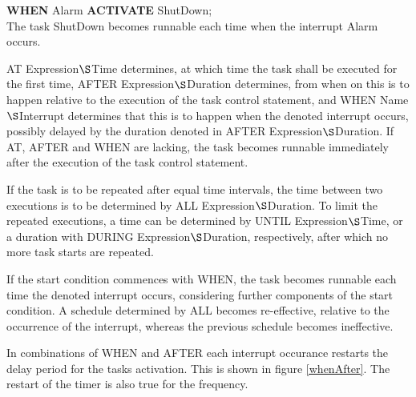 {\bf WHEN} Alarm {\bf ACTIVATE} ShutDown;\\
The task ShutDown becomes runnable each time when the
interrupt Alarm occurs.

AT  
 Expression$\S $Time determines, at which time the task shall be
executed for the first time, AFTER
 Expression$\S $Duration determines,
from when on this is to happen relative to the execution of the task
control statement, and WHEN 
 Name$\S $Interrupt determines that this is
to happen when the denoted interrupt occurs, possibly delayed by the
duration denoted in AFTER Expression$\S $Duration. If AT, AFTER and WHEN
are lacking, the task becomes runnable immediately after the execution
of the task control statement.

If the task is to be repeated after equal time intervals, the time between
two executions is to be determined by ALL
 Expression$\S $Duration. To
limit the repeated executions, a time can be determined by 
UNTIL
Expression$\S $Time, or a duration with DURING
 Expression$\S $Duration,
respectively, after which no more task starts are repeated.

If the start condition commences with WHEN, the task becomes runnable
each time the denoted interrupt occurs, considering further components
of the start condition. A schedule determined by ALL becomes
re-effective, relative to the occurrence of the interrupt, whereas the
previous schedule becomes ineffective.

In combinations of WHEN and AFTER each interrupt occurance restarts
the delay period for the tasks activation.
This is shown in figure  \ref{whenAfter}.
The restart of the timer is also true for the frequency.

